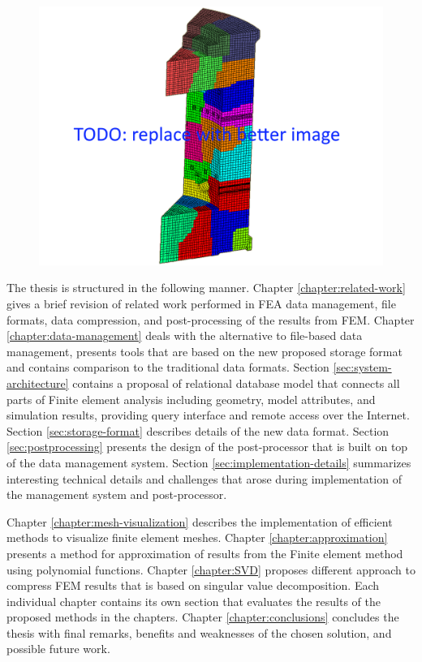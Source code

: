 \begin{figure}[H]
\centering
\includegraphics[width=\textwidth]{figures/chapter-introduction/motivation-example}
\decoRule
\caption[]{}
\label{fig:motivation-example}
\end{figure}

The thesis is structured in the following manner. Chapter \ref{chapter:related-work} gives a brief revision of related work performed in FEA data management, file formats, data compression, and post-processing of the results from FEM. Chapter \ref{chapter:data-management} deals with the alternative to file-based data management, presents tools that are based on the new proposed storage format and contains comparison to the traditional data formats. Section \ref{sec:system-architecture} contains a proposal of relational database model that connects all parts of Finite element analysis including geometry, model attributes, and simulation results, providing query interface and remote access over the Internet. Section \ref{sec:storage-format} describes details of the new data format. Section \ref{sec:postprocessing} presents the design of the post-processor that is built on top of the data management system. Section \ref{sec:implementation-details} summarizes interesting technical details and challenges that arose during implementation of the management system and post-processor.

Chapter \ref{chapter:mesh-visualization} describes the implementation of efficient methods to visualize finite element meshes. Chapter \ref{chapter:approximation} presents a method for approximation of results from the Finite element method using polynomial functions. Chapter \ref{chapter:SVD} proposes different approach to compress FEM results that is based on singular value decomposition. Each individual chapter contains its own section that evaluates the results of the proposed methods in the chapters. Chapter \ref{chapter:conclusions} concludes the thesis with final remarks, benefits and weaknesses of the chosen solution, and possible future work.

